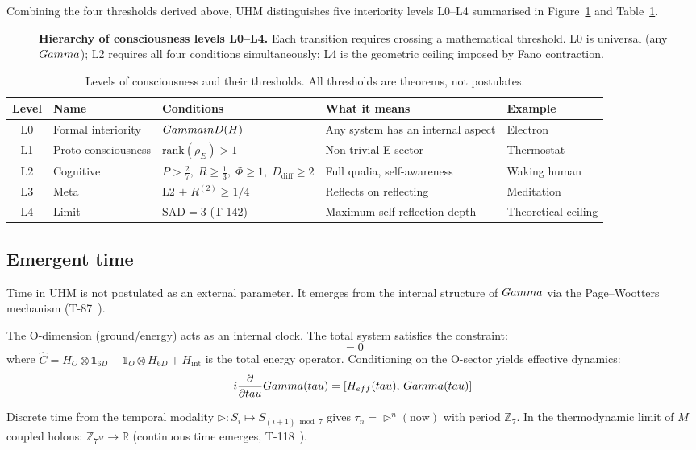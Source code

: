 Combining the four thresholds derived above, UHM distinguishes five
interiority levels L0--L4 summarised in Figure~\ref{fig:levels} and
Table~\ref{tab:levels}.

\begin{figure}[H]
\centering

\caption{\textbf{Hierarchy of consciousness levels L0--L4.} Each transition requires
crossing a mathematical threshold. L0 is universal (any $Gamma$); L2 requires all four
conditions simultaneously; L4 is the geometric ceiling imposed by Fano contraction.}
\label{fig:levels}
\end{figure}

\begin{table}[H]
\centering
\caption{Levels of consciousness and their thresholds. All thresholds are theorems, not postulates.}
\label{tab:levels}
\small
\begin{tabular}{@{}clp{4.5cm}p{3.8cm}l@{}}
\toprule
\textbf{Level} & \textbf{Name} & \textbf{Conditions} & \textbf{What it means} & \textbf{Example} \\
\midrule
L0 & Formal interiority & $Gamma in D(H)$ & Any system has an internal aspect & Electron \\
L1 & Proto-consciousness & $\mathrm{rank}(\rho_E) > 1$ & Non-trivial E-sector & Thermostat \\
L2 & Cognitive & $P > \tfrac{2}{7},\; R \geq \tfrac{1}{3},\; \Phi \geq 1,\; D_{\mathrm{diff}} \geq 2$ & Full qualia, self-awareness & Waking human \\
L3 & Meta & L2 $+\; R^{(2)} \geq 1/4$ & Reflects on reflecting & Meditation \\
L4 & Limit & $\mathrm{SAD} = 3$ (T-142) & Maximum self-reflection depth & Theoretical ceiling \\
\bottomrule
\end{tabular}
\end{table}

\subsection{Emergent time}
\label{subsec:emergent-time}

Time in UHM is not postulated as an external parameter. It emerges from the internal
structure of $Gamma$ via the Page--Wootters mechanism (T-87~).

The O-dimension (ground/energy) acts as an internal clock. The total system satisfies the
constraint:
\begin{equation}
  [\hat{C},\, \Gam_{\mathrm{total}}] = 0
  \label{eq:pw-constraint}
\end{equation}
where $\hat{C} = H_O \otimes \mathbb{1}_{6D} + \mathbb{1}_O \otimes H_{6D} + H_{\mathrm{int}}$
is the total energy operator. Conditioning on the O-sector yields effective dynamics:
\begin{equation}
  i\frac{\partial}{\partial tau}Gamma(tau) = [H_{eff}(tau),\, Gamma(tau)]
  \label{eq:pw-dynamics}
\end{equation}

Discrete time from the temporal modality $\triangleright: S_i \mapsto S_{(i+1) \bmod 7}$
gives $\tau_n = \triangleright^n(\mathrm{now})$ with period $\mathbb{Z}_7$. In the
thermodynamic limit of $M$ coupled holons: $\mathbb{Z}_{7^M} \to \mathbb{R}$
(continuous time emerges, T-118~).
